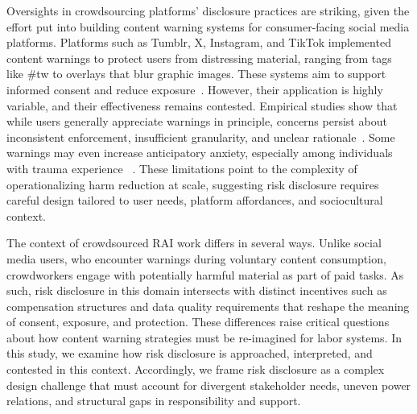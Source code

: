 Oversights in crowdsourcing platforms' disclosure practices are striking, given the effort put into building content warning systems for consumer-facing social media platforms. Platforms such as Tumblr, X, Instagram, and TikTok implemented content warnings to protect users from distressing material, ranging from tags like \#tw to overlays that blur graphic images. These systems aim to support informed consent and reduce exposure~\cite{Zhang2024PerceptionsTriggerWarnings, vit2025use}. However, their application is highly variable, and their effectiveness remains contested. Empirical studies show that while users generally appreciate warnings in principle, concerns persist about inconsistent enforcement, insufficient granularity, and unclear rationale~\cite{charles2022typology, bridgland2024meta, bell2025warning}. Some warnings may even increase anticipatory anxiety, especially among individuals with trauma experience ~\cite{sharevski2022meaningful}. These limitations point to the complexity of operationalizing harm reduction at scale, suggesting risk disclosure requires careful design tailored to user needs, platform affordances, and sociocultural context.

The context of crowdsourced RAI work differs in several ways. Unlike social media users, who encounter warnings during voluntary content consumption, crowdworkers engage with potentially harmful material as part of paid tasks. As such, risk disclosure in this domain intersects with distinct incentives such as compensation structures and data quality requirements that reshape the meaning of consent, exposure, and protection. These differences raise critical questions about how content warning strategies must be re-imagined for labor systems.
In this study, we examine how risk disclosure is approached, interpreted, and contested in this context. Accordingly, we frame risk disclosure as a complex design challenge that must account for divergent stakeholder needs, uneven power relations, and structural gaps in responsibility and support.



